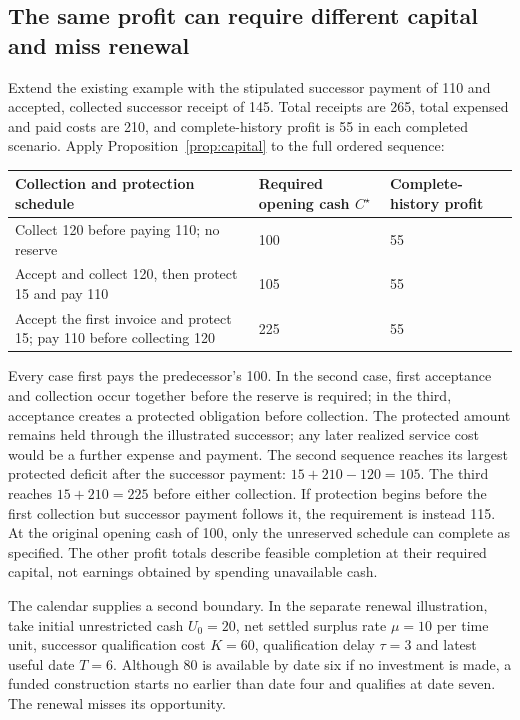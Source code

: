 \documentclass[11pt,letterpaper]{article}
\begin{document}
\subsection{The same profit can require different capital and miss renewal}
Extend the existing example with the stipulated successor payment of 110 and accepted, collected successor receipt of 145. Total receipts are 265, total expensed and paid costs are 210, and complete-history profit is 55 in each completed scenario. Apply Proposition~\ref{prop:capital} to the full ordered sequence:
\begin{center}\small
\begin{tabularx}{\linewidth}{@{}YP{2.25cm}P{2.15cm}@{}}\toprule
Collection and protection schedule & Required opening cash $C^\star$ & Complete-history profit\\\midrule
Collect 120 before paying 110; no reserve & 100 & 55\\
Accept and collect 120, then protect 15 and pay 110 & 105 & 55\\
Accept the first invoice and protect 15; pay 110 before collecting 120 & 225 & 55\\\bottomrule
\end{tabularx}\end{center}
Every case first pays the predecessor's 100. In the second case, first acceptance and collection occur together before the reserve is required; in the third, acceptance creates a protected obligation before collection. The protected amount remains held through the illustrated successor; any later realized service cost would be a further expense and payment. The second sequence reaches its largest protected deficit after the successor payment: $15+210-120=105$. The third reaches $15+210=225$ before either collection. If protection begins before the first collection but successor payment follows it, the requirement is instead 115. At the original opening cash of 100, only the unreserved schedule can complete as specified. The other profit totals describe feasible completion at their required capital, not earnings obtained by spending unavailable cash.

The calendar supplies a second boundary. In the separate renewal illustration, take initial unrestricted cash $U_0=20$, net settled surplus rate $\mu=10$ per time unit, successor qualification cost $K=60$, qualification delay $\tau=3$ and latest useful date $T=6$. Although 80 is available by date six if no investment is made, a funded construction starts no earlier than date four and qualifies at date seven. The renewal misses its opportunity.
\end{document}
